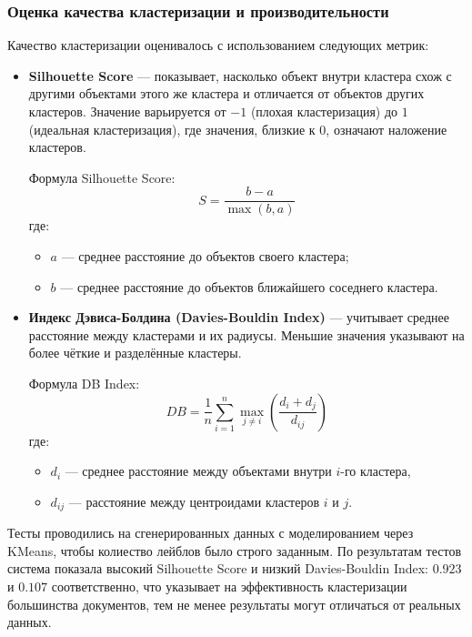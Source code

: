 \begin{itemize}
\subsubsection{Оценка качества кластеризации и производительности}

Качество кластеризации оценивалось с использованием следующих метрик:

\begin{itemize}
    \item \textbf{Silhouette Score} — показывает, насколько объект внутри кластера схож с другими объектами этого же кластера и отличается от объектов других кластеров. Значение варьируется от $-1$ (плохая кластеризация) до $1$ (идеальная кластеризация), где значения, близкие к $0$, означают наложение кластеров.

    Формула Silhouette Score:
    \begin{equation}
    S = \frac{b - a}{\max(b, a)}  
    \end{equation}
    где:
    \begin{itemize}
        \item $a$ — среднее расстояние до объектов своего кластера;
        \item $b$ — среднее расстояние до объектов ближайшего соседнего кластера.
    \end{itemize}

    \item \textbf{Индекс Дэвиса-Болдина (Davies-Bouldin Index)} — учитывает среднее расстояние между кластерами и их радиусы. Меньшие значения указывают на более чёткие и разделённые кластеры.

    Формула DB Index:
    \begin{equation}
    DB = \frac{1}{n} \sum_{i=1}^{n} \max_{j \ne i} \left( \frac{d_i + d_j}{d_{ij}} \right)
    \end{equation}
    где:
    \begin{itemize}
        \item $d_i$ — среднее расстояние между объектами внутри $i$-го кластера,
        \item $d_{ij}$ — расстояние между центроидами кластеров $i$ и $j$.
    \end{itemize}
\end{itemize}
Тесты проводились на сгенерированных данных с моделированием через KMeans, чтобы колиество лейблов было строго заданным. 
По результатам тестов система показала высокий Silhouette Score и низкий Davies-Bouldin Index: $0.923$ и $0.107$ соответственно, что указывает на эффективность кластеризации большинства документов, тем не менее результаты могут отличаться от реальных данных.


\end{itemize}

